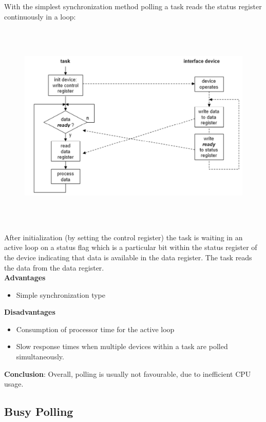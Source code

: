With the simplest synchronization method polling a task reads the status register continuously in a loop:
\nsl{\newpage}
 	\begin{figure}[h]
    \centering
    \includegraphics[width=14cm, height=10cm]{Images/image123.png}
    \label{fig:Fig 72}
    \end{figure}

After initialization (by setting the control register) the task is waiting in an active loop on a status flag which is a particular bit within the status register of the device indicating that  data is available in the data register. The task reads the data from the data register.\\

\textbf{Advantages}

\begin{itemize}
\item Simple synchronization type
\end{itemize}

\textbf{Disadvantages}

\begin{itemize}
\item Consumption of processor time for the active loop
\item Slow response times when multiple devices within a task are polled simultaneously.
\end{itemize}

\textbf{Conclusion}: Overall, polling is usually not favourable, due to inefficient CPU usage.\\
\newpage
\subsection{Busy Polling}

